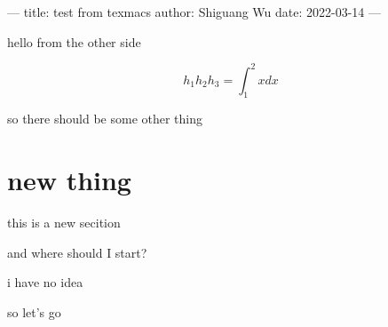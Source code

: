 ---
title: test from texmacs
author: Shiguang Wu
date: 2022-03-14
---



hello from the other side

$$h_1 h_2 h_3 = \int_1^2 x {dx}$$

so there should be some other thing

\section{new thing}

this is a new secition

and where should I start?

i have no idea

so let's go

\


